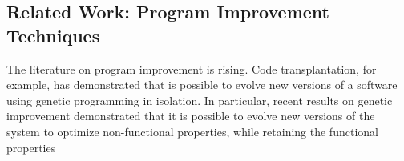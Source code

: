 \subsection{Related Work: Program Improvement Techniques}
\label{sec-existing}

The literature on program improvement is rising. Code transplantation, for
example, has demonstrated that is possible to evolve new versions of a software
using genetic programming in isolation. In particular, recent results on genetic
improvement demonstrated that it is possible to evolve new versions of the
system to optimize non-functional properties, while retaining the functional
properties
